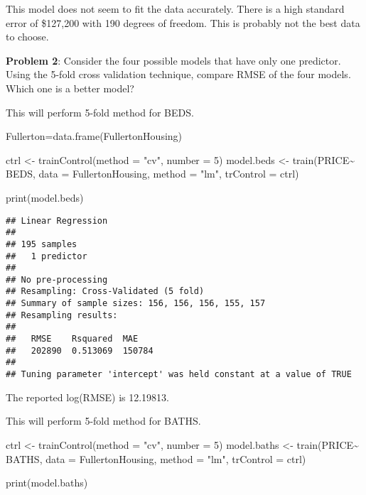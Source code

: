 \documentclass[
]{article}
\newenvironment{Shaded}{\begin{snugshade}}{\end{snugshade}}
\newcommand{\AttributeTok}[1]{\textcolor[rgb]{0.77,0.63,0.00}{#1}}
\newcommand{\DecValTok}[1]{\textcolor[rgb]{0.00,0.00,0.81}{#1}}
\newcommand{\FunctionTok}[1]{\textcolor[rgb]{0.00,0.00,0.00}{#1}}
\newcommand{\NormalTok}[1]{#1}
\newcommand{\OtherTok}[1]{\textcolor[rgb]{0.56,0.35,0.01}{#1}}
\newcommand{\SpecialCharTok}[1]{\textcolor[rgb]{0.00,0.00,0.00}{#1}}
\newcommand{\StringTok}[1]{\textcolor[rgb]{0.31,0.60,0.02}{#1}}
\begin{document}
This model does not seem to fit the data accurately. There is a high
standard error of \$127,200 with 190 degrees of freedom. This is
probably not the best data to choose.

\textbf{Problem 2}: Consider the four possible models that have only one
predictor. Using the 5-fold cross validation technique, compare RMSE of
the four models. Which one is a better model?

This will perform 5-fold method for BEDS.

\begin{Shaded}
\begin{Highlighting}[]
\NormalTok{Fullerton}\OtherTok{=}\FunctionTok{data.frame}\NormalTok{(FullertonHousing)}

\NormalTok{ctrl }\OtherTok{\textless{}{-}} \FunctionTok{trainControl}\NormalTok{(}\AttributeTok{method =} \StringTok{"cv"}\NormalTok{, }\AttributeTok{number =} \DecValTok{5}\NormalTok{)}
\NormalTok{model.beds }\OtherTok{\textless{}{-}} \FunctionTok{train}\NormalTok{(PRICE}\SpecialCharTok{\textasciitilde{}}\NormalTok{ BEDS, }
               \AttributeTok{data =}\NormalTok{ FullertonHousing, }\AttributeTok{method =} \StringTok{"lm"}\NormalTok{, }\AttributeTok{trControl =}\NormalTok{ ctrl)}

\FunctionTok{print}\NormalTok{(model.beds)}
\end{Highlighting}
\end{Shaded}

\begin{verbatim}
## Linear Regression 
## 
## 195 samples
##   1 predictor
## 
## No pre-processing
## Resampling: Cross-Validated (5 fold) 
## Summary of sample sizes: 156, 156, 156, 155, 157 
## Resampling results:
## 
##   RMSE    Rsquared  MAE   
##   202890  0.513069  150784
## 
## Tuning parameter 'intercept' was held constant at a value of TRUE
\end{verbatim}

The reported log(RMSE) is 12.19813.

This will perform 5-fold method for BATHS.

\begin{Shaded}
\begin{Highlighting}[]
\NormalTok{ctrl }\OtherTok{\textless{}{-}} \FunctionTok{trainControl}\NormalTok{(}\AttributeTok{method =} \StringTok{"cv"}\NormalTok{, }\AttributeTok{number =} \DecValTok{5}\NormalTok{)}
\NormalTok{model.baths }\OtherTok{\textless{}{-}} \FunctionTok{train}\NormalTok{(PRICE}\SpecialCharTok{\textasciitilde{}}\NormalTok{ BATHS, }
               \AttributeTok{data =}\NormalTok{ FullertonHousing, }\AttributeTok{method =} \StringTok{"lm"}\NormalTok{, }\AttributeTok{trControl =}\NormalTok{ ctrl)}

\FunctionTok{print}\NormalTok{(model.baths)}
\end{Highlighting}
\end{Shaded}
\end{document}
